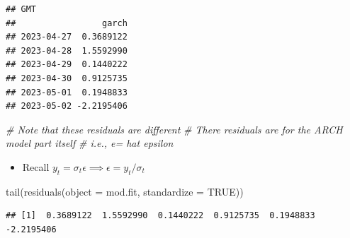 \documentclass[
]{book}
\newenvironment{Shaded}{\begin{snugshade}}{\end{snugshade}}
\newcommand{\AttributeTok}[1]{\textcolor[rgb]{0.77,0.63,0.00}{#1}}
\newcommand{\CommentTok}[1]{\textcolor[rgb]{0.56,0.35,0.01}{\textit{#1}}}
\newcommand{\ConstantTok}[1]{\textcolor[rgb]{0.00,0.00,0.00}{#1}}
\newcommand{\DecValTok}[1]{\textcolor[rgb]{0.00,0.00,0.81}{#1}}
\newcommand{\FunctionTok}[1]{\textcolor[rgb]{0.00,0.00,0.00}{#1}}
\newcommand{\NormalTok}[1]{#1}
\newcommand{\OtherTok}[1]{\textcolor[rgb]{0.56,0.35,0.01}{#1}}
\newcommand{\SpecialCharTok}[1]{\textcolor[rgb]{0.00,0.00,0.00}{#1}}
\providecommand{\tightlist}{%
  \setlength{\itemsep}{0pt}\setlength{\parskip}{0pt}}
\theoremstyle{definition}
\theoremstyle{definition}
\theoremstyle{definition}
\theoremstyle{definition}
\theoremstyle{remark}
\begin{document}
\begin{Shaded}
\end{Shaded}

\begin{verbatim}
## GMT
##                 garch
## 2023-04-27  0.3689122
## 2023-04-28  1.5592990
## 2023-04-29  0.1440222
## 2023-04-30  0.9125735
## 2023-05-01  0.1948833
## 2023-05-02 -2.2195406
\end{verbatim}

\begin{Shaded}
\begin{Highlighting}[]
\CommentTok{\# Note that these residuals are different}
\CommentTok{\# There residuals are for the ARCH model part itself}
\CommentTok{\# i.e., e= hat epsilon}
\end{Highlighting}
\end{Shaded}

\begin{itemize}
\tightlist
\item
  Recall \(y_t=\sigma_t\epsilon\implies \epsilon=y_t/\sigma_t\)
\end{itemize}

\begin{Shaded}
\begin{Highlighting}[]
\FunctionTok{tail}\NormalTok{(}\FunctionTok{residuals}\NormalTok{(}\AttributeTok{object =}\NormalTok{ mod.fit, }\AttributeTok{standardize =} \ConstantTok{TRUE}\NormalTok{))}
\end{Highlighting}
\end{Shaded}

\begin{verbatim}
## [1]  0.3689122  1.5592990  0.1440222  0.9125735  0.1948833 -2.2195406
\end{verbatim}
\end{document}
